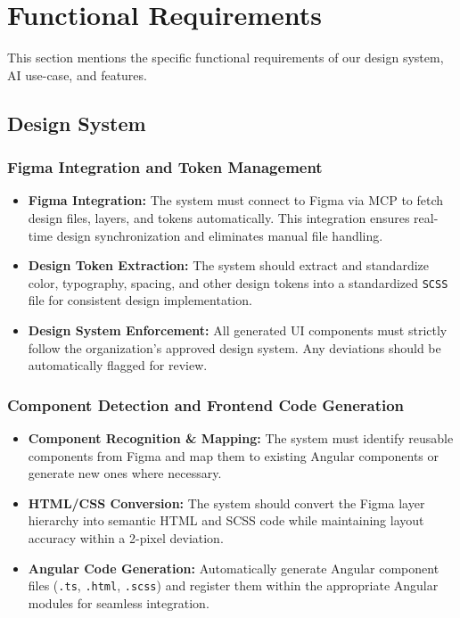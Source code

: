 \section{Functional Requirements}

This section mentions the specific functional requirements of our design system, AI use-case, and features.

\subsection{Design System}

\subsubsection{Figma Integration and Token Management}

\begin{itemize}
    \item \textbf{Figma Integration:}
    The system must connect to Figma via MCP to fetch design files, layers, and tokens automatically. This integration ensures real-time design synchronization and eliminates manual file handling.
    \item \textbf{Design Token Extraction:}
    The system should extract and standardize color, typography, spacing, and other design tokens into a standardized \texttt{SCSS} file for consistent design implementation.
    \item \textbf{Design System Enforcement:}
    All generated UI components must strictly follow the organization’s approved design system. Any deviations should be automatically flagged for review.
\end{itemize}

\subsubsection{Component Detection and Frontend Code Generation}

\begin{itemize}
    \item \textbf{Component Recognition \& Mapping:}
    The system must identify reusable components from Figma and map them to existing Angular components or generate new ones where necessary.
    \item \textbf{HTML/CSS Conversion:}
    The system should convert the Figma layer hierarchy into semantic HTML and SCSS code while maintaining layout accuracy within a 2-pixel deviation.
    \item \textbf{Angular Code Generation:}
    Automatically generate Angular component files (\texttt{.ts}, \texttt{.html}, \texttt{.scss}) and register them within the appropriate Angular modules for seamless integration.
\end{itemize}

